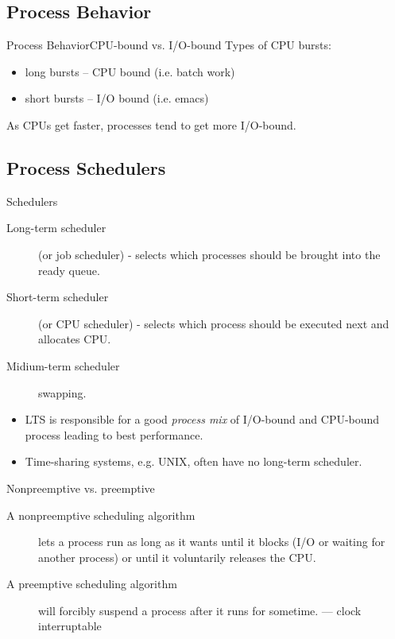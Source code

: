 \subsection{Process Behavior}
\label{sec:process-behavior}

\begin{frame}{Process Behavior}{CPU-bound vs. I/O-bound}
  Types of CPU bursts:
  \begin{itemize}
  \item long bursts -- CPU bound (i.e. batch work)
  \item short bursts -- I/O bound (i.e. emacs)
  \end{itemize}
  \begin{center}
     
  \end{center}
  As CPUs get faster, processes tend to get more I/O-bound.
\end{frame}

\subsection{Process Schedulers}

\begin{frame}{Schedulers}
  \begin{description}
  \item[Long-term scheduler] (or job scheduler) - selects which processes should be brought into the
    ready queue.
  \item[Short-term scheduler] (or CPU scheduler) - selects which process should be executed next and
    allocates CPU.
  \item[Midium-term scheduler] swapping.
  \end{description}
  \begin{itemize}
  \item LTS is responsible for a good \emph{process mix} of I/O-bound and CPU-bound process leading
    to best performance.
  \item Time-sharing systems, e.g. UNIX, often have no long-term scheduler.
  \end{itemize}
\end{frame}

\begin{frame}{Nonpreemptive vs. preemptive}
  \begin{description}
  \item[A nonpreemptive scheduling algorithm] lets a process run as long as it wants until it
    blocks (I/O or waiting for another process) or until it voluntarily releases the CPU. 
  \item[A preemptive scheduling algorithm] will forcibly suspend a process after it runs for
    sometime. --- clock interruptable
  \end{description}
\end{frame}

